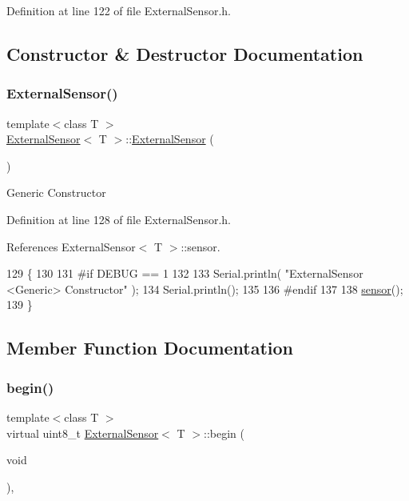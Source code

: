 Definition at line 122 of file External\+Sensor.\+h.



\subsection{Constructor \& Destructor Documentation}
\mbox{\label{classExternalSensor_a8b991447fba33253103d06198b838751}} 
\subsubsection{\texorpdfstring{External\+Sensor()}{ExternalSensor()}}
{\footnotesize\ttfamily template$<$class T $>$ \\
\hyperlink{classExternalSensor}{External\+Sensor}$<$ T $>$\+::\hyperlink{classExternalSensor}{External\+Sensor} (\begin{DoxyParamCaption}{ }\end{DoxyParamCaption})\hspace{0.3cm}{\ttfamily [inline]}}

Generic Constructor 

Definition at line 128 of file External\+Sensor.\+h.



References External\+Sensor$<$ T $>$\+::sensor.


\begin{DoxyCode}
129     \{
130     
131 \textcolor{preprocessor}{    #if DEBUG == 1 }
132 
133         Serial.println( \textcolor{stringliteral}{"ExternalSensor <Generic> Constructor"} );
134         Serial.println();
135     
136 \textcolor{preprocessor}{    #endif}
137 
138         \hyperlink{classExternalSensor_a6e1f518119abe08c14b498ce24a7e1b3}{sensor}();
139     \}
\end{DoxyCode}


\subsection{Member Function Documentation}
\mbox{\label{classExternalSensor_ab6fe1379d55b656a048e0fba1e0a32e6}} 
\subsubsection{\texorpdfstring{begin()}{begin()}}
{\footnotesize\ttfamily template$<$class T $>$ \\
virtual uint8\+\_\+t \hyperlink{classExternalSensor}{External\+Sensor}$<$ T $>$\+::begin (\begin{DoxyParamCaption}\item[{void}]{ }\end{DoxyParamCaption})\hspace{0.3cm}{\ttfamily [inline]}, {\ttfamily [virtual]}}

